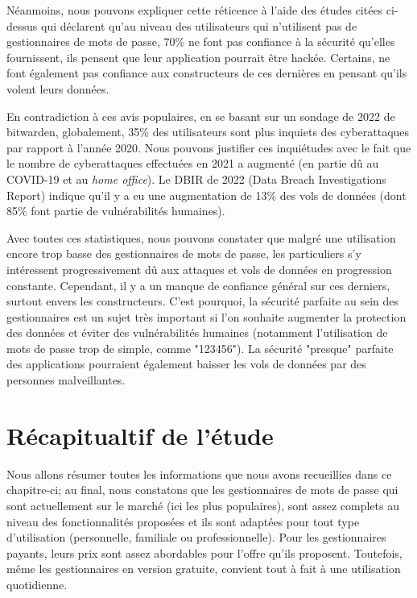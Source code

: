 Néanmoins, nous pouvons expliquer cette réticence à l'aide des études citées ci-dessus qui déclarent qu'au niveau des utilisateurs qui n'utilisent pas de gestionnaires de mots de passe, 70\% ne font pas confiance à la sécurité qu'elles fournissent, ils pensent que leur application pourrait être hackée. Certains, ne font également pas confiance aux constructeurs de ces dernières en pensant qu'ils volent leurs données.

En contradiction à ces avis populaires, en se basant sur un sondage de 2022 de bitwarden\cite{bitwardenreport}, globalement, 35\% des utilisateurs sont plus inquiets des cyberattaques par rapport à l'année 2020. Nous pouvons justifier ces inquiétudes avec le fait que le nombre de cyberattaques effectuées en 2021 a augmenté (en partie dû au COVID-19 et au \textit{home office}). Le DBIR de 2022 (Data Breach Investigations Report)\cite{dbir} indique qu'il y a eu une augmentation de 13\% des vols de données (dont 85\% font partie de vulnérabilités humaines).

Avec toutes ces statistiques, nous pouvons constater que malgré une utilisation encore trop basse des gestionnaires de mots de passe, les particuliers s'y intéressent progressivement dû aux attaques et vols de données en progression constante. Cependant, il y a un manque de confiance général sur ces derniers, surtout envers les constructeurs. C'est pourquoi, la sécurité parfaite au sein des gestionnaires est un sujet très important si l'on souhaite augmenter la protection des données et éviter des vulnérabilités humaines (notamment l'utilisation de mots de passe trop de simple, comme "123456"). La sécurité "presque" parfaite des applications pourraient également baisser les vols de données par des personnes malveillantes.
\section{Récapitualtif de l'étude}
Nous allons résumer toutes les informations que nous avons recueillies dans ce chapitre-ci; au final, nous constatons que les gestionnaires de mots de passe qui sont actuellement sur le marché (ici les plus populaires), sont assez complets au niveau des fonctionnalités proposées et ils sont adaptées pour tout type d'utilisation (personnelle, familiale ou professionnelle). Pour les gestionnaires payants, leurs prix sont assez abordables pour l'offre qu'ils proposent. Toutefois, même les gestionnaires en version gratuite, convient tout à fait à une utilisation quotidienne.

